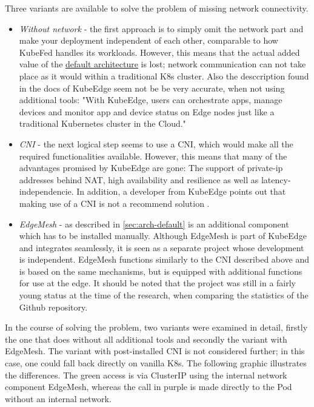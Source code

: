 \documentclass[MIC,Master,english]{twbook}%
\begin{document}
Three variants are available to solve the problem of missing network connectivity.
\begin{itemize}
    \item \textit{Without network} - the first approach is to simply omit the network part and make your deployment independent of each other, comparable to how KubeFed handles its workloads. However, this means that the actual added value of the \hyperref[sec:arch-default]{default architecture} is lost; network communication can not take place as it would within a traditional \ac{K8s} cluster. Also the desccription found in the docs of KubeEdge seem not be be very accurate, when not using additional tools: "With KubeEdge, users can orchestrate apps, manage devices and monitor app and device status on Edge nodes just like a traditional Kubernetes cluster in the Cloud." \cite{ke-docs-why}
    \item \textit{CNI} - the next logical step seems to use a \ac{CNI}, which would make all the required functionalities available. However, this means that many of the advantages promised by KubeEdge are gone: The support of private-ip addresses behind \ac{NAT}, high availability and resilience as well as latency-independencie. In addition, a developer from KubeEdge points out that making use of a \ac{CNI} is not a recommend solution \cite{ke-cni-no}.
    \item \textit{EdgeMesh} - as described in \autoref{sec:arch-default} is an additional component which has to be installed manually. Although EdgeMesh is part of KubeEdge and integrates seamlessly, it is seen as a separate project whose development is independent. EdgeMesh functions similarly to the \ac{CNI} described above and is based on the same mechanisms, but is equipped with additional functions for use at the edge. It should be noted that the project was still in a fairly young status at the time of the research, when comparing the statistics of the Github repository.
\end{itemize}
In the course of solving the problem, two variants were examined in detail, firstly the one that does without all additional tools and secondly the variant with EdgeMesh. The variant with post-installed CNI is not considered further; in this case, one could fall back directly on vanilla \ac{K8s}. The following graphic illustrates the differences. The green access is via ClusterIP using the internal network component EdgeMesh, whereas the call in purple is made directly to the Pod without an internal network.
\end{document}
